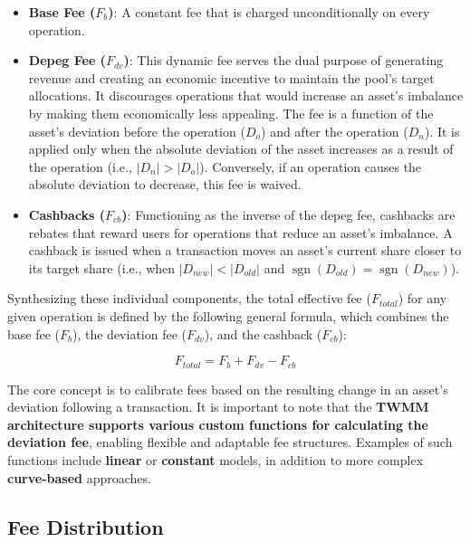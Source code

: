 \begin{itemize}
	\item \textbf{Base Fee ($F_b$)}: A constant fee that is charged unconditionally on every operation.
	
	\item \textbf{Depeg Fee ($F_{dv}$)}: This dynamic fee serves the dual purpose of generating revenue and creating an economic incentive to maintain the pool's target allocations. It discourages operations that would increase an asset's imbalance by making them economically less appealing. The fee is a function of the asset's deviation before the operation ($D_o$) and after the operation ($D_n$). It is applied only when the absolute deviation of the asset increases as a result of the operation (i.e., $ \lvert D_n \rvert > \lvert D_o \rvert$). Conversely, if an operation causes the absolute deviation to decrease, this fee is waived.
	
	\item \textbf{Cashbacks ($F_{cb}$)}: Functioning as the inverse of the depeg fee, cashbacks are rebates that reward users for operations that reduce an asset's imbalance. A cashback is issued when a transaction moves an asset's current share closer to its target share (i.e., when $\lvert D_{new} \rvert < \lvert D_{old} \rvert$ and $\operatorname{sgn}(D_{old}) = \operatorname{sgn}(D_{new})$).
\end{itemize}

Synthesizing these individual components, the total effective fee ($F_{total}$) for any given operation is defined by the following general formula, which combines the base fee ($F_b$), the deviation fee ($F_{dv}$), and the cashback ($F_{cb}$):

\begin{equation}
	\label{eq:total_fee_formula}
	F_{total} = F_b + F_{dv} - F_{cb}
\end{equation}

The core concept is to calibrate fees based on the resulting change in an asset's deviation following a transaction. It is important to note that the \textbf{TWMM architecture supports various custom functions for calculating the deviation fee}, enabling flexible and adaptable fee structures. Examples of such functions include \textbf{linear} or \textbf{constant} models, in addition to more complex \textbf{curve-based} approaches.

\subsection{Fee Distribution}

